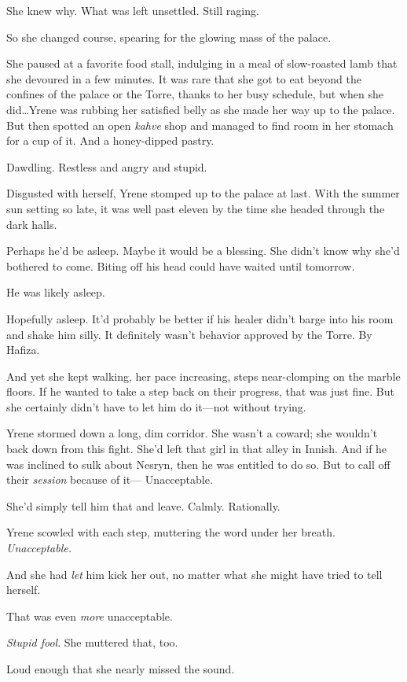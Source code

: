 She knew why.
What was left unsettled.
Still raging.

So she changed course, spearing for the glowing mass of the palace.

She paused at a favorite food stall, indulging in a meal of slow-roasted lamb that she devoured in a few minutes.
It was rare that she got to eat beyond the confines of the palace or the Torre, thanks to her busy schedule, but when she did\ldots Yrene was rubbing her satisfied belly as she made her way up to the palace.
But then spotted an open \emph{kahve} shop and managed to find room in her stomach for a cup of it.
And a honey-dipped pastry.

Dawdling.
Restless and angry and stupid.

Disgusted with herself, Yrene stomped up to the palace at last.
With the summer sun setting so late, it was well past eleven by the time she headed through the dark halls.

Perhaps he'd be asleep.
Maybe it would be a blessing.
She didn't know why she'd bothered to come.
Biting off his head could have waited until tomorrow.

He was likely asleep.

Hopefully asleep.
It'd probably be better if his healer didn't barge into his room and shake him silly.
It definitely wasn't behavior approved by the Torre.
By Hafiza.

And yet she kept walking, her pace increasing, steps near-clomping on the marble floors.
If he wanted to take a step back on their progress, that was just fine.
But she certainly didn't have to let him do it---not without trying.

Yrene stormed down a long, dim corridor.
She wasn't a coward; she wouldn't back down from this fight.
She'd left that girl in that alley in Innish.
And if he was inclined to sulk about Nesryn, then he was entitled to do so.
But to call off their \emph{session} because of it--- Unacceptable.

She'd simply tell him that and leave.
Calmly.
Rationally.

Yrene scowled with each step, muttering the word under her breath.
\emph{Unacceptable.}

And she had \emph{let} him kick her out, no matter what she might have tried to tell herself.

That was even \emph{more} unacceptable.

\emph{Stupid fool}.
She muttered that, too.

Loud enough that she nearly missed the sound.

